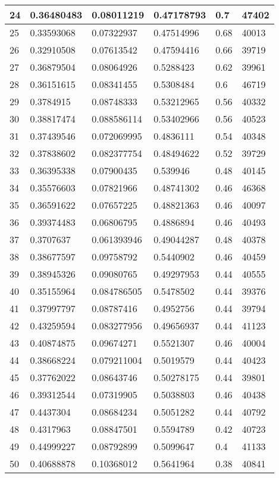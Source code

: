 \begin{longtable}{|l|l|l|l|l|l|}
24 & 0.36480483 & 0.08011219 & 0.47178793 & 0.7 & 47402 \\ \hline 
25 & 0.33593068 & 0.07322937 & 0.47514996 & 0.68 & 40013 \\ \hline 
26 & 0.32910508 & 0.07613542 & 0.47594416 & 0.66 & 39719 \\ \hline 
27 & 0.36879504 & 0.08064926 & 0.5288423 & 0.62 & 39961 \\ \hline 
28 & 0.36151615 & 0.08341455 & 0.5308484 & 0.6 & 46719 \\ \hline 
29 & 0.3784915 & 0.08748333 & 0.53212965 & 0.56 & 40332 \\ \hline 
30 & 0.38817474 & 0.088586114 & 0.53402966 & 0.56 & 40523 \\ \hline 
31 & 0.37439546 & 0.072069995 & 0.4836111 & 0.54 & 40348 \\ \hline 
32 & 0.37838602 & 0.082377754 & 0.48494622 & 0.52 & 39729 \\ \hline 
33 & 0.36395338 & 0.07900435 & 0.539946 & 0.48 & 40145 \\ \hline 
34 & 0.35576603 & 0.07821966 & 0.48741302 & 0.46 & 46368 \\ \hline 
35 & 0.36591622 & 0.07657225 & 0.48821363 & 0.46 & 40097 \\ \hline 
36 & 0.39374483 & 0.06806795 & 0.4886894 & 0.46 & 40493 \\ \hline 
37 & 0.3707637 & 0.061393946 & 0.49044287 & 0.48 & 40378 \\ \hline 
38 & 0.38677597 & 0.09758792 & 0.5440902 & 0.46 & 40459 \\ \hline 
39 & 0.38945326 & 0.09080765 & 0.49297953 & 0.44 & 40555 \\ \hline 
40 & 0.35155964 & 0.084786505 & 0.5478502 & 0.44 & 39376 \\ \hline 
41 & 0.37997797 & 0.08787416 & 0.4952756 & 0.44 & 39794 \\ \hline 
42 & 0.43259594 & 0.083277956 & 0.49656937 & 0.44 & 41123 \\ \hline 
43 & 0.40874875 & 0.09674271 & 0.5521307 & 0.46 & 40004 \\ \hline 
44 & 0.38668224 & 0.079211004 & 0.5019579 & 0.44 & 40423 \\ \hline 
45 & 0.37762022 & 0.08643746 & 0.50278175 & 0.44 & 39801 \\ \hline 
46 & 0.39312544 & 0.07319905 & 0.5038803 & 0.46 & 40438 \\ \hline 
47 & 0.4437304 & 0.08684234 & 0.5051282 & 0.44 & 40792 \\ \hline 
48 & 0.4317963 & 0.08847501 & 0.5594789 & 0.42 & 40723 \\ \hline 
49 & 0.44999227 & 0.08792899 & 0.5099647 & 0.4 & 41133 \\ \hline 
50 & 0.40688878 & 0.10368012 & 0.5641964 & 0.38 & 40841 \\ \hline 
\end{longtable}